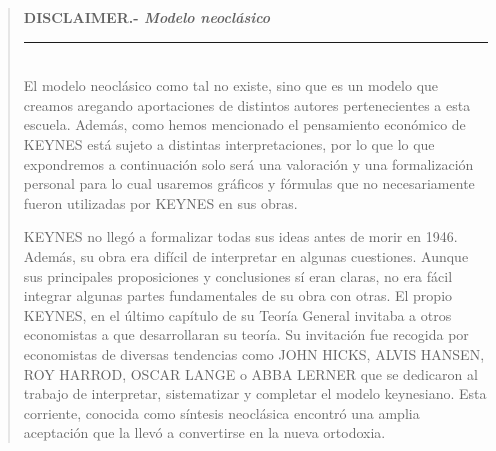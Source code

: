 \documentclass[10pt,a4paper]{article}
\newenvironment{specialblock}[1]{%
      \begin{quote} %
      \small %
      \noindent\textbf{#1}\\[-0.3em] %
      \rule{\linewidth}{0.4pt}\\[0.6em]}{
      \end{quote}}
\begin{document}
\begin{specialblock}{DISCLAIMER.- \textit{Modelo neoclásico}}
    El modelo neoclásico como tal no existe, sino que es un modelo que creamos aregando aportaciones de distintos autores pertenecientes a esta escuela. Además, como hemos mencionado el pensamiento económico de KEYNES está sujeto a distintas interpretaciones, por lo que lo que expondremos a continuación solo será una valoración y una formalización personal para lo cual usaremos gráficos y fórmulas que no necesariamente fueron utilizadas por KEYNES en sus obras. 
    
    KEYNES no llegó a formalizar todas sus ideas antes de morir en 1946. Además, su obra era difícil de interpretar en algunas cuestiones. Aunque sus principales proposiciones y conclusiones sí eran claras, no era fácil integrar algunas partes fundamentales de su obra con otras. El propio KEYNES, en el último capítulo de su Teoría General invitaba a otros economistas a que desarrollaran su teoría. Su invitación fue recogida por economistas de diversas tendencias como JOHN HICKS, ALVIS HANSEN, ROY HARROD, OSCAR LANGE o ABBA LERNER que se dedicaron al trabajo de interpretar, sistematizar y completar el modelo keynesiano. Esta corriente, conocida como síntesis neoclásica encontró una amplia aceptación que la llevó a convertirse en la nueva ortodoxia.    
\end{specialblock}
\end{document}
